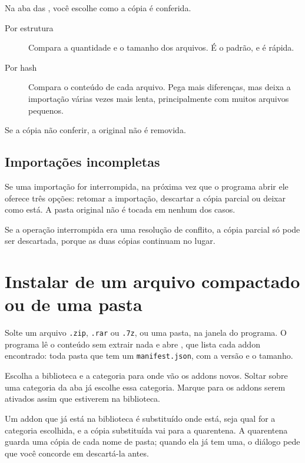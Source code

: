 \documentclass[11pt,a4paper]{article}
\begin{document}
Na aba  das , você escolhe como a cópia é conferida.

\begin{description}
  \item[Por estrutura] Compara a quantidade e o tamanho dos arquivos. É o padrão,
    e é rápida.
  \item[Por hash] Compara o conteúdo de cada arquivo. Pega mais diferenças, mas
    deixa a importação várias vezes mais lenta, principalmente com muitos
    arquivos pequenos.
\end{description}

Se a cópia não conferir, a original não é removida.

\subsection{Importações incompletas}

Se uma importação for interrompida, na próxima vez que o programa abrir ele
oferece três opções: retomar a importação, descartar a cópia parcial ou deixar
como está. A pasta original não é tocada em nenhum dos casos.

Se a operação interrompida era uma resolução de conflito, a cópia parcial só
pode ser descartada, porque as duas cópias continuam no lugar.

\section{Instalar de um arquivo compactado ou de uma pasta}

Solte um arquivo \texttt{.zip}, \texttt{.rar} ou \texttt{.7z}, ou uma pasta, na
janela do programa. O programa lê o conteúdo sem extrair nada e abre
, que lista cada addon encontrado: toda pasta que
tem um \texttt{manifest.json}, com a versão e o tamanho.

Escolha a biblioteca e a categoria para onde vão os addons novos. Soltar sobre
uma categoria da aba  já escolhe essa categoria. Marque
 para os addons serem ativados assim que
estiverem na biblioteca.

Um addon que já está na biblioteca é substituído onde está, seja qual for a
categoria escolhida, e a cópia substituída vai para a quarentena. A quarentena
guarda uma cópia de cada nome de pasta; quando ela já tem uma, o diálogo pede
que você concorde em descartá-la antes.

\end{document}
